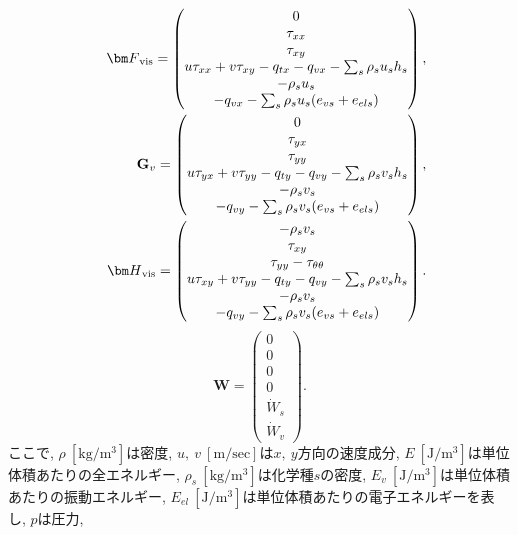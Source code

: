 %
\begin{eqnarray}
  &&{\bm F}_\mathrm{vis}=
  \begin{pmatrix}
  0\\
  \tau_{xx}\\
  \tau_{xy}\\
  u\tau_{xx}+v\tau_{xy}-q_{tx}-q_{vx}-\sum_{s}\rho_{s}u_{s}h_{s}\\
  -\rho_{s}u_{s}\\
  -q_{vx}-\sum_{s}\rho_{s}u_{s}(e_{vs}+e_{els})
  \end{pmatrix}\nonumber,\\
  &&{\bf G}_v=
  \begin{pmatrix}
  0\\
  \tau_{yx}\\
  \tau_{yy}\\
  u\tau_{yx}+v\tau_{yy}-q_{ty}-q_{vy}-\sum_{s}\rho_{s}v_{s}h_{s}\\
  -\rho_{s}v_{s}\\
  -q_{vy}-\sum_{s}\rho_{s}v_{s}(e_{vs}+e_{els})
  \end{pmatrix},\\
  &&{\bm H}_\mathrm{vis}=
  \begin{pmatrix}
  -\rho_{s}v_{s}\\
  \tau_{xy}\\
  \tau_{yy}-\tau_{\theta \theta}\\
  u\tau_{xy}+v\tau_{yy}-q_{ty}-q_{vy}-\sum_{s}\rho_{s}v_{s}h_{s}\\
  -\rho_{s}v_{s}\\
  -q_{vy}-\sum_{s}\rho_{s}v_{s}(e_{vs}+e_{els})
  \end{pmatrix}\nonumber.
\end{eqnarray}
%
\begin{equation}
  {\bm W}=
  \begin{pmatrix}
  0\\
  0\\
  0\\
  0\\
  {\dot W}_{s}\\
  {\dot W}_{v}
  \end{pmatrix}.
  \label{tab:termgen}
\end{equation}
%
ここで,
$\rho~\mathrm{[kg/m^3]}$は密度,
$u,\ v~\mathrm{[m/sec]}$は$x,\ y$方向の速度成分,
$E~\mathrm{[J/m^3]}$は単位体積あたりの全エネルギー, 
$\rho_s~\mathrm{[kg/m^3]}$は化学種$s$の密度,
$E_v~\mathrm{[J/m^3]}$は単位体積あたりの振動エネルギー, 
$E_{el}~\mathrm{[J/m^3]}$は単位体積あたりの電子エネルギーを表し, 
$p$は圧力,

